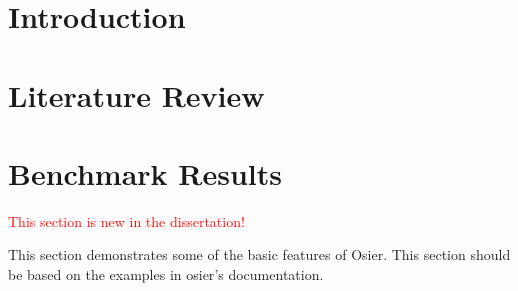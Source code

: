 \chapter{Introduction}
\chapter{Literature Review}
\label{chapter:lit-review}



% 

% 


\chapter{Benchmark Results}


\textcolor{red}{This section is new in the dissertation!}

This section demonstrates some of the basic features of Osier. This section
should be based on the examples in \ac{osier}'s documentation.


